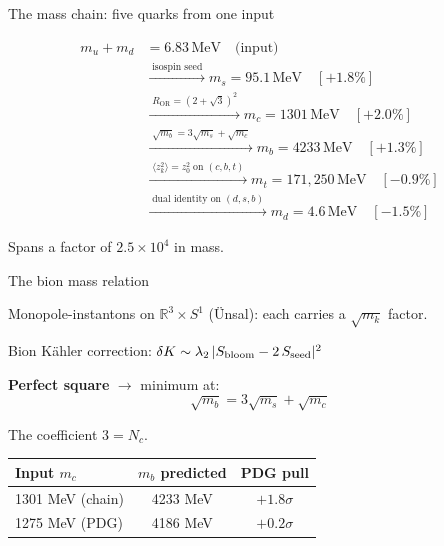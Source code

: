 \documentclass[aspectratio=169,12pt]{beamer}
\newcommand{\MeV}{\,\text{MeV}}
\begin{document}
\begin{frame}{The mass chain: five quarks from one input}

\begin{equation*}
\boxed{
\begin{aligned}
m_u + m_d &= 6.83\MeV \quad\text{(input)}\\[4pt]
&\xrightarrow{\;\text{isospin seed}\;}
m_s = 95.1\MeV \quad[+1.8\%]\\[4pt]
&\xrightarrow{\;R_{\mathrm{OR}} = (2{+}\sqrt{3})^2\;}
m_c = 1301\MeV \quad[+2.0\%]\\[4pt]
&\xrightarrow{\;\sqrt{m_b} = 3\sqrt{m_s} + \sqrt{m_c}\;}
m_b = 4233\MeV \quad[+1.3\%]\\[4pt]
&\xrightarrow{\;\langle z_k^2\rangle = z_0^2\;\text{on }(c,b,t)\;}
m_t = 171{,}250\MeV \quad[-0.9\%]\\[4pt]
&\xrightarrow{\;\text{dual identity on }(d,s,b)\;}
m_d = 4.6\MeV \quad[-1.5\%]
\end{aligned}
}
\end{equation*}

Spans a factor of $2.5 \times 10^4$ in mass.

\end{frame}

\begin{frame}{The bion mass relation}

Monopole-instantons on $\mathbb{R}^3\times S^1$ (\"Unsal):
each carries a $\sqrt{m_k}$ factor.

\medskip
Bion K\"ahler correction:
$\delta K \sim \lambda_2\,|S_{\rm bloom} - 2\,S_{\rm seed}|^2$

\medskip
\textbf{Perfect square} $\to$ minimum at:
\begin{equation*}
\boxed{\sqrt{m_b} = 3\sqrt{m_s} + \sqrt{m_c}}
\end{equation*}

The coefficient $3 = N_c$.

\bigskip
\begin{center}
\begin{tabular}{lcc}
\toprule
Input $m_c$ & $m_b$ predicted & PDG pull \\
\midrule
1301 MeV (chain) & 4233 MeV & $+1.8\sigma$ \\
1275 MeV (PDG) & 4186 MeV & $+0.2\sigma$ \\
\bottomrule
\end{tabular}
\end{center}

\end{frame}
\end{document}
